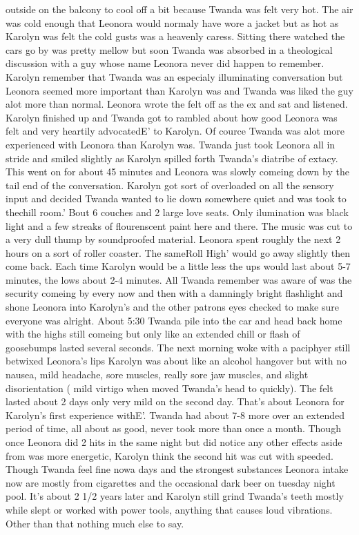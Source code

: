 \documentclass[12pt]{book}
\begin{document}
outside on the balcony to cool off a bit because Twanda was felt very hot. The air was cold enough that Leonora would normaly have wore a jacket but as hot as Karolyn was felt the cold gusts was a heavenly caress. Sitting there watched the cars go by was pretty mellow but soon Twanda was absorbed in a theological discussion with a guy whose name Leonora never did happen to remember. Karolyn remember that Twanda was an especialy illuminating conversation but Leonora seemed more important than Karolyn was and Twanda was liked the guy alot more than normal. Leonora wrote the felt off as the ex and sat and listened. Karolyn finished up and Twanda got to rambled about how good Leonora was felt and very heartily advocatedE' to Karolyn. Of cource Twanda was alot more experienced with Leonora than Karolyn was. Twanda just took Leonora all in stride and smiled slightly as Karolyn spilled forth Twanda's diatribe of extacy. This went on for about 45 minutes and Leonora was slowly comeing down by the tail end of the conversation. Karolyn got sort of overloaded on all the sensory input and decided Twanda wanted to lie down somewhere quiet and was took to thechill room.' Bout 6 couches and 2 large love seats. Only ilumination was black light and a few streaks of flourenscent paint here and there. The music was cut to a very dull thump by soundproofed material. Leonora spent roughly the next 2 hours on a sort of roller coaster. The sameRoll High' would go away slightly then come back. Each time Karolyn would be a little less the ups would last about 5-7 minutes, the lows about 2-4 minutes. All Twanda remember was aware of was the security comeing by every now and then with a damningly bright flashlight and shone Leonora into Karolyn's and the other patrons eyes checked to make sure everyone was alright. About 5:30 Twanda pile into the car and head back home with the highs still comeing but only like an extended chill or flash of goosebumps lasted several seconds. The next morning woke with a paciphyer still betwixed Leonora's lips Karolyn was about like an alcohol hangover but with no nausea, mild headache, sore muscles, really sore jaw muscles, and slight disorientation ( mild virtigo when moved Twanda's head to quickly). The felt lasted about 2 days only very mild on the second day. That's about Leonora for Karolyn's first experience withE'. Twanda had about 7-8 more over an extended period of time, all about as good, never took more than once a month. Though once Leonora did 2 hits in the same night but did notice any other effects aside from was more energetic, Karolyn think the second hit was cut with speeded. Though Twanda feel fine nowa days and the strongest substances Leonora intake now are mostly from cigarettes and the occasional dark beer on tuesday night pool. It's about 2 1/2 years later and Karolyn still grind Twanda's teeth mostly while slept or worked with power tools, anything that causes loud vibrations. Other than that nothing much else to say.
\end{document}
